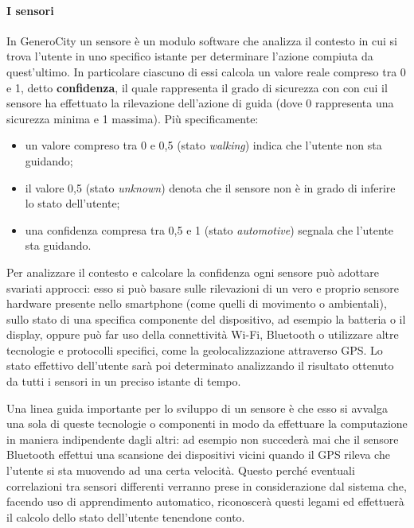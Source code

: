 \paragraph{I sensori}
In GeneroCity un sensore è un modulo software che analizza il contesto in cui si trova l'utente in uno specifico istante per determinare l'azione compiuta da quest'ultimo. In particolare ciascuno di essi calcola un valore reale compreso tra 0 e 1, detto \textbf{confidenza}, il quale rappresenta il grado di sicurezza con con cui il sensore ha effettuato la rilevazione dell'azione di guida (dove 0 rappresenta una sicurezza minima e 1 massima). Più specificamente:
\begin{itemize}
    \item un valore compreso tra 0 e 0,5 (stato \textit{walking}) indica che l'utente non sta guidando;
    \item il valore 0,5 (stato \textit{unknown}) denota che il sensore non è in grado di inferire lo stato dell'utente;
    \item una confidenza compresa tra 0,5 e 1 (stato \textit{automotive}) segnala che l'utente sta guidando.
\end{itemize}

Per analizzare il contesto e calcolare la confidenza ogni sensore può adottare svariati approcci: esso si può basare sulle rilevazioni di un vero e proprio sensore hardware presente nello smartphone (come quelli di movimento o ambientali), sullo stato di una specifica componente del dispositivo, ad esempio la batteria o il display, oppure può far uso della connettività Wi-Fi, Bluetooth o utilizzare altre tecnologie e protocolli specifici, come la geolocalizzazione attraverso GPS. Lo stato effettivo dell'utente sarà poi determinato analizzando il risultato ottenuto da tutti i sensori in un preciso istante di tempo.

Una linea guida importante per lo sviluppo di un sensore è che esso si avvalga una sola di queste tecnologie o componenti in modo da effettuare la computazione in maniera indipendente dagli altri: ad esempio non succederà mai che il sensore Bluetooth effettui una scansione dei dispositivi vicini quando il GPS rileva che l'utente si sta muovendo ad una certa velocità. Questo perché eventuali correlazioni tra sensori differenti verranno prese in considerazione dal sistema che, facendo uso di apprendimento automatico, riconoscerà questi legami ed effettuerà il calcolo dello stato dell'utente tenendone conto.



